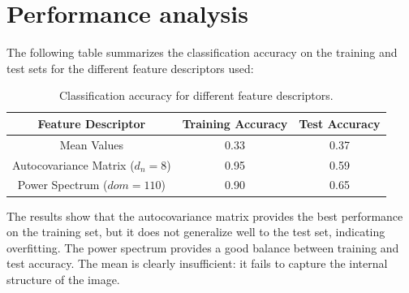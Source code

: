 \documentclass[12pt,a4paper]{article}
\begin{document}
\section{Performance analysis}
The following table summarizes the classification accuracy on the training and test sets for the different feature descriptors used:
\begin{table}[H]
    \centering
    \begin{tabular}{|c|c|c|}
        \hline
        Feature Descriptor & Training Accuracy & Test Accuracy \\
        \hline
        Mean Values & 0.33 & 0.37 \\
        Autocovariance Matrix ($d_n = 8$) & 0.95 & 0.59 \\
        Power Spectrum ($dom = 110$) & 0.90 & 0.65 \\
        \hline
    \end{tabular}
    \caption{Classification accuracy for different feature descriptors.}
    \label{tab:performance}
\end{table}

The results show that the autocovariance matrix provides the best performance on the training set, but it does not generalize well to the test set, indicating overfitting.
The power spectrum provides a good balance between training and test accuracy.
The mean is clearly insufficient: it fails to capture the internal structure of the image. \\
\end{document}
